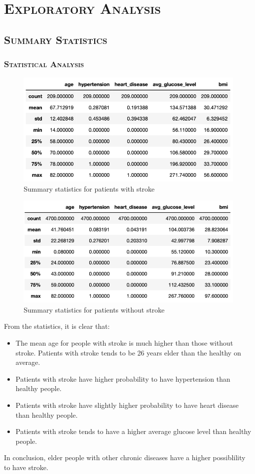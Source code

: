 \documentclass[a4paper,12pt]{article}
\begin{document}
\section{\textsc{Exploratory Analysis}}
\subsection{\textsc{Summary Statistics}}
\subsubsection{\textsc{Statistical Analysis}}
\begin{figure}[h] 
    \centering
    \includegraphics[width=.5\textwidth]{stat_p1} 
    \caption{Summary statistics for patients with stroke} 
\end{figure}
\begin{figure}[h] 
    \centering
    \includegraphics[width=.5\textwidth]{stat_p2} 
    \caption{Summary statistics for patients without stroke} 
\end{figure}
From the statistics, it is clear that:
\begin{itemize}
\item The mean age for people with stroke is much higher than those without stroke. Patients with stroke tends to be 26 years elder than the healthy on average.
\item Patients with stroke have higher probability to have hypertension than healthy people.
\item Patients with stroke have slightly higher probability to have heart disease than healthy people.
\item Patients with stroke tends to have a higher average glucose level than healthy people.
\end{itemize}
\par In conclusion, elder people with other chronic diseases have a higher possiblility to have stroke.
\end{document}
